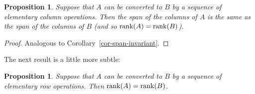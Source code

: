 \documentclass[reqno]{amsart}
\newtheorem{proposition}[theorem]{Proposition}
\theoremstyle{definition}
\begin{document}
\begin{proposition}\label{prop-co-rank}
 Suppose that $A$ can be converted to $B$ by a sequence of elementary
 column operations.  Then the span of the columns of $A$ is the same
 as the span of the columns of $B$ (and so $\operatorname{rank}(A)=\operatorname{rank}(B)$).
\end{proposition}
\begin{proof}
 Analogous to Corollary~\ref{cor-span-invariant}.
\end{proof}

The next result is a little more subtle:
\begin{proposition}\label{prop-ro-rank}
 Suppose that $A$ can be converted to $B$ by a sequence of elementary
 \emph{row} operations.  Then $\operatorname{rank}(A)=\operatorname{rank}(B)$.
\end{proposition}
\end{document}
